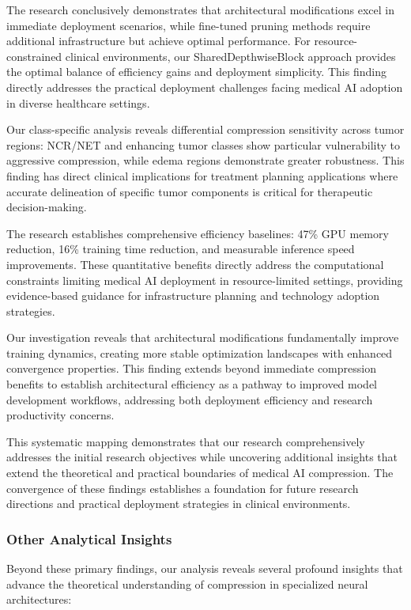 \documentclass[12pt,a4paper]{article}
\begin{document}
\begin{enumerate}
The research conclusively demonstrates that architectural modifications excel in immediate deployment scenarios, while fine-tuned pruning methods require additional infrastructure but achieve optimal performance. For resource-constrained clinical environments, our SharedDepthwiseBlock approach provides the optimal balance of efficiency gains and deployment simplicity. This finding directly addresses the practical deployment challenges facing medical AI adoption in diverse healthcare settings.

Our class-specific analysis reveals differential compression sensitivity across tumor regions: NCR/NET and enhancing tumor classes show particular vulnerability to aggressive compression, while edema regions demonstrate greater robustness. This finding has direct clinical implications for treatment planning applications where accurate delineation of specific tumor components is critical for therapeutic decision-making.

The research establishes comprehensive efficiency baselines: 47\% GPU memory reduction, 16\% training time reduction, and measurable inference speed improvements. These quantitative benefits directly address the computational constraints limiting medical AI deployment in resource-limited settings, providing evidence-based guidance for infrastructure planning and technology adoption strategies.

Our investigation reveals that architectural modifications fundamentally improve training dynamics, creating more stable optimization landscapes with enhanced convergence properties. This finding extends beyond immediate compression benefits to establish architectural efficiency as a pathway to improved model development workflows, addressing both deployment efficiency and research productivity concerns.

This systematic mapping demonstrates that our research comprehensively addresses the initial research objectives while uncovering additional insights that extend the theoretical and practical boundaries of medical AI compression. The convergence of these findings establishes a foundation for future research directions and practical deployment strategies in clinical environments.

\subsubsection{Other Analytical Insights}

Beyond these primary findings, our analysis reveals several profound insights that advance the theoretical understanding of compression in specialized neural architectures:



\end{enumerate}
\end{document}
